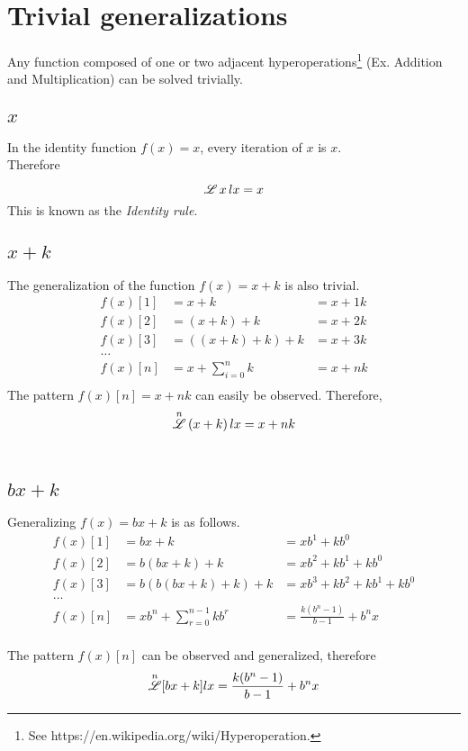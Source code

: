 \documentclass[12pt, letterpaper]{article}
\begin{document}
\section{Trivial generalizations}
Any function composed of one or two adjacent hyperoperations\footnote{See https://en.wikipedia.org/wiki/Hyperoperation.} (Ex. Addition and Multiplication) can be solved trivially.

\subsection{$x$}
In the identity function \(f(x) = x\), every iteration of \(x\) is \(x\). 
\\
Therefore
$$\overset{}{\mathscr{L}} \, x \, lx = x$$
This is known as the \textit{Identity rule}.

\subsection{$x+k$}
The generalization of the function $f(x) = x+k$ is also trivial.
\begin{align*}
    f(x)[1] &= x + k             &= x + 1k \\
    f(x)[2] &= (x + k) + k       &= x + 2k \\
    f(x)[3] &= ((x + k) + k) + k &= x + 3k \\
       \dots \\
    f(x)[n] &= x + \sum_{i=0}^n k  &= x + nk \\
\end{align*}
The pattern $f(x)[n] = x + nk$ can easily be observed. Therefore,
$$\overset{n}{\mathscr{L}} \, (x+k) \, lx = x+nk$$
\\

\subsection{$bx+k$}
Generalizing {$f(x) = bx+k$} is as follows.
\begin{align*}
    f(x)[1] &= bx + k             &= xb^{1}+kb^{0} \\
    f(x)[2] &= b(bx + k) + k       &= xb^{2}+kb^{1}+kb^{0} \\
    f(x)[3] &= b(b(bx + k) + k) + k &= xb^{3} + kb^{2} + kb^{1} + kb^{0} \\
       \dots \\
    f(x)[n] &= xb^{n}+\sum_{r=0}^{n-1} kb^{r}  &= \frac{k(b^{n}-1)}{b-1}+b^{n}x
\end{align*}
\\
The pattern $f(x)[n]$ can be observed and generalized, therefore
$$\overset{n}{\mathscr{L}} [bx+k] lx = \frac{k(b^{n}-1)}{b-1}+b^{n}x$$
\end{document}
